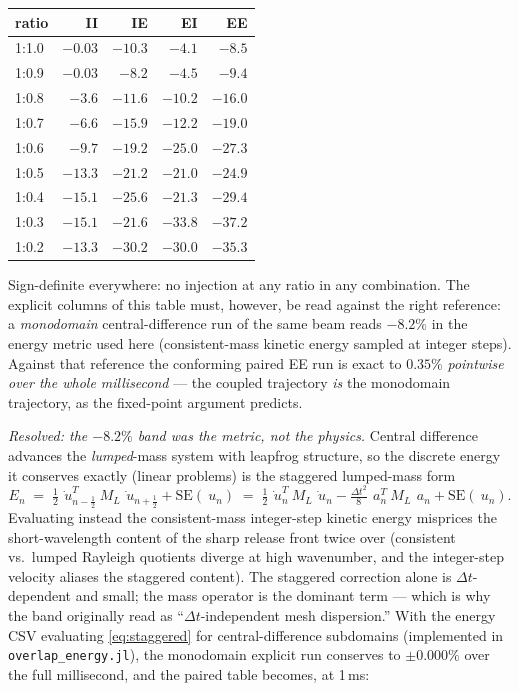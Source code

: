 \documentclass[11pt]{article}
\newcommand{\code}[1]{\texttt{#1}}
\begin{document}
\begin{center}
\begin{tabular}{lrrrr}
\toprule
ratio & II & IE & EI & EE \\
\midrule
1:1.0 & $-0.03$ & $-10.3$ & $-4.1$ & $-8.5$ \\
1:0.9 & $-0.03$ & $-8.2$ & $-4.5$ & $-9.4$ \\
1:0.8 & $-3.6$ & $-11.6$ & $-10.2$ & $-16.0$ \\
1:0.7 & $-6.6$ & $-15.9$ & $-12.2$ & $-19.0$ \\
1:0.6 & $-9.7$ & $-19.2$ & $-25.0$ & $-27.3$ \\
1:0.5 & $-13.3$ & $-21.2$ & $-21.0$ & $-24.9$ \\
1:0.4 & $-15.1$ & $-25.6$ & $-21.3$ & $-29.4$ \\
1:0.3 & $-15.1$ & $-21.6$ & $-33.8$ & $-37.2$ \\
1:0.2 & $-13.3$ & $-30.2$ & $-30.0$ & $-35.3$ \\
\bottomrule
\end{tabular}
\end{center}

Sign-definite everywhere: no injection at any ratio in any combination. The
explicit columns of this table must, however, be read against the right
reference: a \emph{monodomain} central-difference run of the same beam reads
$-8.2\%$ in the energy metric used here (consistent-mass kinetic energy
sampled at integer steps). Against that reference the conforming paired EE
run is exact to $0.35\%$ \emph{pointwise over the whole millisecond} --- the
coupled trajectory \emph{is} the monodomain trajectory, as the fixed-point
argument predicts.

\emph{Resolved: the $-8.2\%$ band was the metric, not the physics.} Central
difference advances the \emph{lumped}-mass system with leapfrog structure,
so the discrete energy it conserves exactly (linear problems) is the
staggered lumped-mass form
\begin{equation}
  E_n \;=\; \tfrac12\,\dot{~u}_{n-\frac12}^{T} ~M_L\, \dot{~u}_{n+\frac12}
        + \mathrm{SE}(~u_n)
      \;=\; \tfrac12\,\dot{~u}_n^{T} ~M_L\, \dot{~u}_n
        - \tfrac{\Delta t^2}{8}\, ~a_n^{T} ~M_L\, ~a_n
        + \mathrm{SE}(~u_n).
  \label{eq:staggered}
\end{equation}
Evaluating instead the consistent-mass integer-step kinetic energy
misprices the short-wavelength content of the sharp release front twice
over (consistent vs.\ lumped Rayleigh quotients diverge at high wavenumber,
and the integer-step velocity aliases the staggered content). The staggered
correction alone is $\Delta t$-dependent and small; the mass operator is
the dominant term --- which is why the band originally read as
``$\Delta t$-independent mesh dispersion.'' With the energy CSV evaluating
\eqref{eq:staggered} for central-difference subdomains (implemented in
\code{overlap\_energy.jl}), the monodomain explicit run conserves to
$\pm 0.000\%$ over the full millisecond, and the paired table becomes, at
1\,ms:
\end{document}
